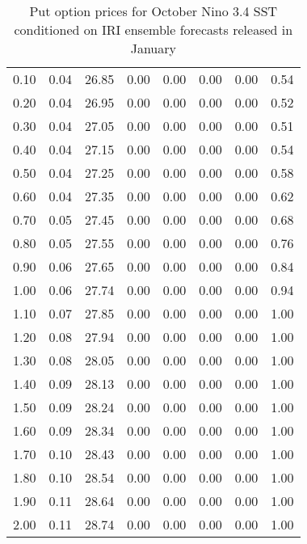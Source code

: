 \begin{table*}[ht]
\begin{tabular}{rrrrrrrr}
  0.10 & 0.04 & 26.85 & 0.00 & 0.00 & 0.00 & 0.00 & 0.54 \\ 
  0.20 & 0.04 & 26.95 & 0.00 & 0.00 & 0.00 & 0.00 & 0.52 \\ 
  0.30 & 0.04 & 27.05 & 0.00 & 0.00 & 0.00 & 0.00 & 0.51 \\ 
  0.40 & 0.04 & 27.15 & 0.00 & 0.00 & 0.00 & 0.00 & 0.54 \\ 
  0.50 & 0.04 & 27.25 & 0.00 & 0.00 & 0.00 & 0.00 & 0.58 \\ 
  0.60 & 0.04 & 27.35 & 0.00 & 0.00 & 0.00 & 0.00 & 0.62 \\ 
  0.70 & 0.05 & 27.45 & 0.00 & 0.00 & 0.00 & 0.00 & 0.68 \\ 
  0.80 & 0.05 & 27.55 & 0.00 & 0.00 & 0.00 & 0.00 & 0.76 \\ 
  0.90 & 0.06 & 27.65 & 0.00 & 0.00 & 0.00 & 0.00 & 0.84 \\ 
  1.00 & 0.06 & 27.74 & 0.00 & 0.00 & 0.00 & 0.00 & 0.94 \\ 
  1.10 & 0.07 & 27.85 & 0.00 & 0.00 & 0.00 & 0.00 & 1.00 \\ 
  1.20 & 0.08 & 27.94 & 0.00 & 0.00 & 0.00 & 0.00 & 1.00 \\ 
  1.30 & 0.08 & 28.05 & 0.00 & 0.00 & 0.00 & 0.00 & 1.00 \\ 
  1.40 & 0.09 & 28.13 & 0.00 & 0.00 & 0.00 & 0.00 & 1.00 \\ 
  1.50 & 0.09 & 28.24 & 0.00 & 0.00 & 0.00 & 0.00 & 1.00 \\ 
  1.60 & 0.09 & 28.34 & 0.00 & 0.00 & 0.00 & 0.00 & 1.00 \\ 
  1.70 & 0.10 & 28.43 & 0.00 & 0.00 & 0.00 & 0.00 & 1.00 \\ 
  1.80 & 0.10 & 28.54 & 0.00 & 0.00 & 0.00 & 0.00 & 1.00 \\ 
  1.90 & 0.11 & 28.64 & 0.00 & 0.00 & 0.00 & 0.00 & 1.00 \\ 
  2.00 & 0.11 & 28.74 & 0.00 & 0.00 & 0.00 & 0.00 & 1.00 \\ 
   \hline
\end{tabular}
\caption{Put option prices for October Nino 3.4 SST conditioned on IRI ensemble forecasts released in January} 
\end{table*}


